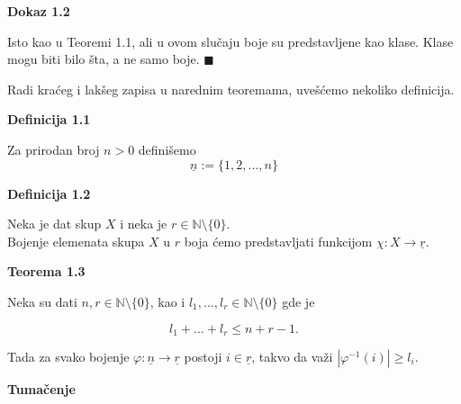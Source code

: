 \documentclass[12pt,a4paper]{article}
\begin{document}
	{\noindent\fontsize{12pt}{12pt}\textbf{Dokaz 1.2}}
	\vspace{0.5em}

	\noindent Isto kao u Teoremi 1.1, ali u ovom slučaju boje su predstavljene kao klase.
	Klase mogu biti bilo šta, a ne samo boje. $\blacksquare$

	\vspace{0.7em}
	
	\noindent Radi kraćeg i lakšeg zapisa u narednim teoremama, uvešćemo nekoliko definicija.
	
	\vspace{0.7em}	
	
	\begin{mdframed}
	
	{\noindent\fontsize{12pt}{12pt}\textbf{Definicija 1.1}}
	\vspace{0.5em}

	\noindent Za prirodan broj $n > 0$ definišemo\\
	\[\underline{n} := \lbrace1, 2, . . . , n \rbrace\]	
	
	\end{mdframed}	
	
	\begin{mdframed}	
	{\noindent\fontsize{12pt}{12pt}\textbf{Definicija 1.2}}
	\vspace{0.5em}

	\noindent Neka je dat skup $X$ i neka je $r \in \mathbb{N} \setminus \lbrace 0 \rbrace$.\\
	Bojenje elemenata skupa $X$ u $r$ boja ćemo predstavljati funkcijom $\chi : X \rightarrow \underline{r}$.
	\end{mdframed}
	
		\vspace{1em}	
	
	{\noindent\fontsize{12pt}{12pt}\textbf{Teorema 1.3}}
	\vspace{0.5em}

	\noindent Neka su dati $n, r \in \mathbb{N} \setminus \lbrace0\rbrace$, kao i $l_{1},...,l_{r} \in \mathbb{N} \setminus \lbrace0\rbrace$ gde je
	
	\[l_{1}+\dots+l_{r} \leq n+r-1.\]

	\noindent Tada za svako bojenje $\varphi:\underline{n} \rightarrow \underline{r}$ postoji $i \in \underline{r}$, takvo da važi $|\varphi^{-1}(i)| \geq l_{i}.$
	\vspace{1.5em}

	{\noindent\fontsize{12pt}{12pt}\textbf{Tumačenje}}
	\vspace{0.5em}
\end{document}
